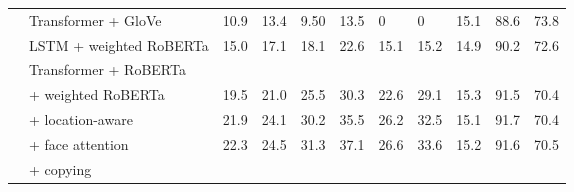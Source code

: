 \begin{table*}[p]
\begin{tabularx}{\textwidth}{llXXXXXX XXX}
      & Transformer + GloVe & 10.9 & 13.4 & 9.50 & 13.5 & 0 & 0 & 15.1 & 88.6 & 73.8 \\
      & LSTM + weighted RoBERTa & 15.0 & 17.1 & 18.1 & 22.6 & 15.1 & 15.2 & 14.9 & 90.2 & 72.6 \\
      \cmidrule{2-11}
      & Transformer + RoBERTa \\
      & \quad + weighted RoBERTa & 19.5 & 21.0 & 25.5 & 30.3 & 22.6 & 29.1 & 15.3 & 91.5 & 70.4 \\
      & \quad\quad + location-aware & 21.9 & 24.1 & 30.2 & 35.5 & 26.2 & 32.5 & 15.1 & 91.7 & 70.4  \\
      & \quad\quad\quad + face attention & 22.3 & 24.5 & 31.3 & 37.1 & 26.6 & 33.6 & 15.2 & 91.6 & 70.5 \\
      & \quad\quad\quad\quad + copying \\
		\bottomrule
	\end{tabularx}
\end{table*}

\twocolumn
